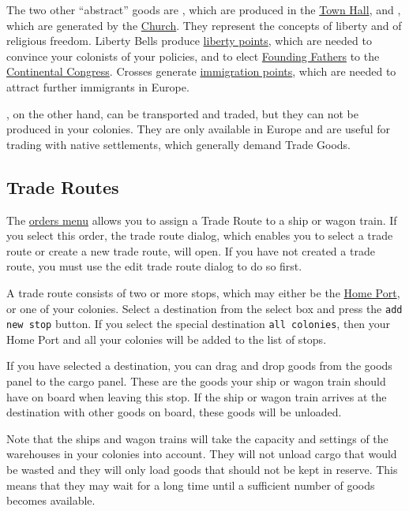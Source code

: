 \documentclass[12pt]{book}
\begin{document}
The two other ``abstract'' goods are , which are
produced in the \hyperlink{Town Hall}{Town Hall}, and ,
which are generated by the \hyperlink{Church}{Church}. They represent
the concepts of liberty and of religious freedom. Liberty Bells
produce \hyperlink{Liberty}{liberty points}, which are needed to
convince your colonists of your policies, and to elect
\hyperlink{Founding Fathers}{Founding Fathers} to the
\hyperlink{Continental Congress}{Continental Congress}. Crosses
generate \hyperlink{Immigration}{immigration points}, which are needed
to attract further immigrants in Europe.

, on the other hand, can be transported and traded,
but they can not be produced in your colonies. They are only available
in Europe and are useful for trading with native settlements, which
generally demand Trade Goods.


\hypertarget{Trade Routes}{\subsection{Trade Routes}}

The \hyperlink{orders menu}{orders menu} allows you to assign a Trade
Route to a ship or wagon train. If you select this order, the trade
route dialog, which enables you to select a trade route or create a
new trade route, will open. If you have not created a trade route, you
must use the edit trade route dialog to do so first.

A trade route consists of two or more stops, which may either be the
\hyperlink{Home Port}{Home Port}, or one of your colonies. Select a
destination from the select box and press the \texttt{add new stop}
button. If you select the special destination \texttt{all colonies},
then your Home Port and all your colonies will be added to the list of
stops.

If you have selected a destination, you can drag and drop goods from
the goods panel to the cargo panel. These are the goods your ship or
wagon train should have on board when leaving this stop. If the ship
or wagon train arrives at the destination with other goods on board,
these goods will be unloaded.

Note that the ships and wagon trains will take the capacity and
settings of the warehouses in your colonies into account. They will
not unload cargo that would be wasted and they will only load goods
that should not be kept in reserve. This means that they may wait
for a long time until a sufficient number of goods becomes available.
\end{document}
